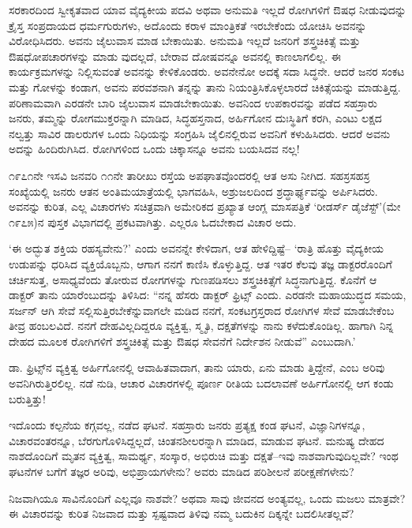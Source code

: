 ಸರಕಾರದಿಂದ ಸ್ವೀಕೃತವಾದ ಯಾವ ವೈದ್ಯಕೀಯ ಪದವಿ ಅಥವಾ ಅನುಮತಿ ಇಲ್ಲದೆ ರೋಗಿಗಳಿಗೆ ಔಷಧ ನೀಡುವುದನ್ನು ಕ್ರೈಸ್ತ ಸಂಪ್ರದಾಯದ ಧರ್ಮಗುರುಗಳು, ಅದೊಂದು ಕರಾಳ ಮಾಂತ್ರಿಕತೆ ಇರಬೇಕೆಂದು ಯೋಚಿಸಿ ಅವನನ್ನು ವಿರೋಧಿಸಿದರು. ಅವನು ಜೈಲುವಾಸ ಮಾಡ ಬೇಕಾಯಿತು. ಅನುಮತಿ ಇಲ್ಲದೆ ಜನರಿಗೆ ಶಸ್ತ್ರಚಿಕಿತ್ಸೆ ಮತ್ತು ಔಷಧೋಪಚಾರಗಳನ್ನು ಮಾಡು ವುದಲ್ಲದೆ, ಬೇರಾವ ದೋಷವನ್ನೂ ಅವನಲ್ಲಿ ಕಾಣಲಾಗಲಿಲ್ಲ. ಈ ಕಾರ್ಯಕ್ರಮಗಳನ್ನು ನಿಲ್ಲಿಸುವಂತೆ ಅವನನ್ನು ಕೇಳಿಕೊಂಡರು. ಅವನೇನೋ ಅದಕ್ಕೆ ಸದಾ ಸಿದ್ಧನೇ. ಆದರೆ ಜನರ ಸಂಕಟ ಮತ್ತು ಗೋಳನ್ನು ಕಂಡಾಗ, ಅವನು ಪರವಶನಾಗಿ ತನ್ನನ್ನು ತಾನು ನಿಯಂತ್ರಿಸಿಕೊಳ್ಳಲಾರದೆ ಚಿಕಿತ್ಸೆಯನ್ನು ಮಾಡುತ್ತಿದ್ದ. ಪರಿಣಾಮವಾಗಿ ಎರಡನೇ ಬಾರಿ ಜೈಲುವಾಸ ಮಾಡಬೇಕಾಯಿತು. ಅವನಿಂದ ಉಪಕಾರವನ್ನು ಪಡೆದ ಸಹಸ್ರಾರು ಜನರು, ತಮ್ಮನ್ನು ರೋಗಮುಕ್ತರನ್ನಾಗಿ ಮಾಡಿದ, ಸಿದ್ಧಹಸ್ತನಾದ, ಅರ್ಹಿಗೋನ ದುಃಸ್ಥಿತಿಗೆ ಕರಗಿ, ಎಂಟು ಲಕ್ಷದ ನಲ್ವತ್ತು ಸಾವಿರ ಡಾಲರುಗಳ ಒಂದು ನಿಧಿಯನ್ನು ಸಂಗ್ರಹಿಸಿ ಜೈಲಿನಲ್ಲಿರುವ ಅವನಿಗೆ ಕಳುಹಿಸಿದರು. ಆದರೆ ಅವನು ಅದನ್ನು ಹಿಂದಿರುಗಿಸಿದ. ರೋಗಿಗಳಿಂದ ಒಂದು ಚಿಕ್ಕಾಸನ್ನೂ ಅವನು ಬಯಸಿದವ ನಲ್ಲ!

೧೯೭೧ನೇ ಇಸವಿ ಜನವರಿ ೧೧ನೇ ತಾರೀಖು ರಸ್ತೆಯ ಅಪಘಾತವೊಂದರಲ್ಲಿ ಆತ ಅಸು ನೀಗಿದ. ಸಹಸ್ರಸಹಸ್ರ ಸಂಖ್ಯೆಯಲ್ಲಿ ಜನರು ಆತನ ಅಂತಿಮಯಾತ್ರೆಯಲ್ಲಿ ಭಾಗವಹಿಸಿ, ಅಶ್ರುಜಲದಿಂದ ಶ್ರದ್ಧಾರ್ಘ್ಯವನ್ನು ಅರ್ಪಿಸಿದರು. ಅವನನ್ನು ಕುರಿತ, ಎಲ್ಲ ವಿಚಾರಗಳು ಸಚಿತ್ರವಾಗಿ ಅಮೇರಿಕದ ಪ್ರಖ್ಯಾತ ಆಂಗ್ಲ ಮಾಸಪತ್ರಿಕೆ ‘ರೀಡರ್ಸ್ ಡೈಜೆಸ್ಟ್​’(ಮೇ ೧೯೭೫)ನ ಪುಸ್ತಕ ವಿಭಾಗದಲ್ಲಿ ಪ್ರಕಟವಾಗಿತ್ತು. ಎಲ್ಲರೂ ಓದಬೇಕಾದ ವಿಚಾರ ಅದು.

‘ಈ ಅದ್ಭುತ ಶಕ್ತಿಯ ರಹಸ್ಯವೇನು?’ ಎಂದು ಅವನನ್ನೇ ಕೇಳಿದಾಗ, ಆತ ಹೇಳಿದ್ದಿಷ್ಟೆ– ‘ರಾತ್ರಿ ಹೊತ್ತು ವೈದ್ಯಕೀಯ ಉಡುಪನ್ನು ಧರಿಸಿದ ವ್ಯಕ್ತಿಯೊಬ್ಬನು, ಆಗಾಗ ನನಗೆ ಕಾಣಿಸಿ ಕೊಳ್ಳುತ್ತಿದ್ದ. ಆತ ಇತರ ಕೆಲವು ತಜ್ಞ ಡಾಕ್ಟರರೊಂದಿಗೆ ಚರ್ಚಿಸುತ್ತ, ಅಸಾಧ್ಯವೆಂದು ತೋರುವ ರೋಗಗಳನ್ನು ಗುಣಪಡಿಸಲು ಶಸ್ತ್ರಚಿಕಿತ್ಸೆಗೆ ಸಿದ್ಧನಾಗುತ್ತಿದ್ದ. ಕೊನೆಗೆ ಆ ಡಾಕ್ಟರ್ ತಾನು ಯಾರೆಂಬುದನ್ನು ತಿಳಿಸಿದ: “ನನ್ನ ಹೆಸರು ಡಾಕ್ಟರ್ ಫ್ರಿಟ್ಸ್ ಎಂದು. ಎರಡನೇ ಮಹಾಯುದ್ಧದ ಸಮಯ, ಸರ್ಜನ್ ಆಗಿ ಸೇವೆ ಸಲ್ಲಿಸುತ್ತಿರಬೇಕೆನ್ನುವಾಗಲೇ ಮಡಿದ ನನಗೆ, ಸಂಕಟಗ್ರಸ್ತರಾದ ರೋಗಿಗಳ ಸೇವೆ ಮಾಡಬೇಕೆಂಬ ತೀವ್ರ ಹಂಬಲವಿದೆ. ನನಗೆ ದೇಹವಿಲ್ಲದಿದ್ದರೂ ವ್ಯಕ್ತಿತ್ವ, ಸ್ಮೃತಿ, ದಕ್ಷತೆಗಳನ್ನು ನಾನು ಕಳೆದುಕೊಂಡಿಲ್ಲ. ಹಾಗಾಗಿ ನಿನ್ನ ದೇಹದ ಮೂಲಕ ರೋಗಿಗಳಿಗೆ ಶಸ್ತ್ರಚಿಕಿತ್ಸೆ ಮತ್ತು ಔಷಧ ಸೇವನೆಗೆ ನಿರ್ದೇಶನ ನೀಡುವೆ” ಎಂಬುದಾಗಿ.’

ಡಾ. ಫ್ರಿಟ್ಸ್​ನ ವ್ಯಕ್ತಿತ್ವ ಅರ್ಹಿಗೋನಲ್ಲಿ ಆವಾಹಿತವಾದಾಗ, ತಾನು ಯಾರು, ಏನು ಮಾಡು ತ್ತಿದ್ದೇನೆ, ಎಂಬ ಅರಿವು ಅವನಿಗಿರುತ್ತಿರಲಿಲ್ಲ. ನಡೆ ನುಡಿ, ಆಚಾರ ವಿಚಾರಗಳಲ್ಲಿ ಪೂರ್ಣ ರೀತಿಯ ಬದಲಾವಣೆ ಅರ್ಹಿಗೋನಲ್ಲಿ ಆಗ ಕಂಡು ಬರುತ್ತಿತ್ತು!

ಇದೊಂದು ಕಲ್ಪನೆಯ ಕಗ್ಗವಲ್ಲ, ನಡೆದ ಘಟನೆ. ಸಹಸ್ರಾರು ಜನರು ಪ್ರತ್ಯಕ್ಷ ಕಂಡ ಘಟನೆ, ವಿಜ್ಞಾನಿಗಳನ್ನೂ, ವಿಚಾರವಂತರನ್ನೂ, ಬೆರಗುಗೊಳಿಸಿದ್ದಲ್ಲದೆ, ಚಿಂತನಶೀಲರನ್ನಾಗಿ ಮಾಡಿದ, ಮಾಡುವ ಘಟನೆ. ಮನುಷ್ಯ ದೇಹದ ನಾಶದೊಂದಿಗೆ ಮೃತನ ವ್ಯಕ್ತಿತ್ವ, ಸಾಮರ್ಥ್ಯ, ಸಂಸ್ಕಾರ, ಅಭಿರುಚಿ ಮತ್ತು ದಕ್ಷತೆ–ಇವು ನಾಶವಾಗುವುದಿಲ್ಲವೇ? ಇಂಥ ಘಟನೆಗಳ ಬಗೆಗೆ ತಜ್ಞರ ಅರಿವು, ಅಭಿಪ್ರಾಯಗಳೇನು? ಅವರು ಮಾಡಿದ ಪರಿಶೀಲನೆ ಪರೀಕ್ಷಣೆಗಳೇನು?

ನಿಜವಾಗಿಯೂ ಸಾವಿನೊಂದಿಗೆ ಎಲ್ಲವೂ ನಾಶವೇ? ಅಥವಾ ಸಾವು ಜೀವನದ ಅಂತ್ಯವಲ್ಲ, ಒಂದು ಮಜಲು ಮಾತ್ರವೇ? ಈ ವಿಚಾರವನ್ನು ಕುರಿತ ನಿಜವಾದ ಮತ್ತು ಸ್ಪಷ್ಟವಾದ ತಿಳಿವು ನಮ್ಮ ಬದುಕಿನ ದಿಕ್ಕನ್ನೇ ಬದಲಿಸೀತಲ್ಲವೆ?


